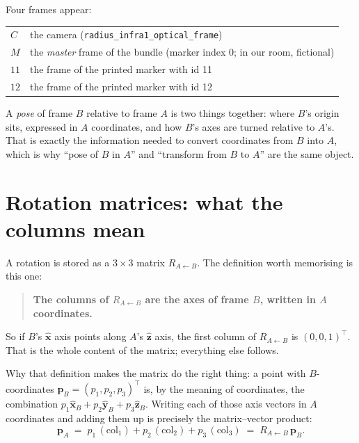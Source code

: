 \documentclass[11pt,a4paper]{article}
\newcommand{\R}[2]{R_{#1 \leftarrow #2}}
\newcommand{\vt}[1]{\mathbf{#1}}
\newcommand{\xh}{\hat{\vt{x}}}
\newcommand{\yh}{\hat{\vt{y}}}
\newcommand{\zh}{\hat{\vt{z}}}
\begin{document}
Four frames appear:

\begin{center}
\begin{tabular}{ll}
\toprule
$C$ & the camera (\texttt{radius\_infra1\_optical\_frame}) \\
$M$ & the \emph{master} frame of the bundle (marker index 0; in our room, fictional) \\
$11$ & the frame of the printed marker with id 11 \\
$12$ & the frame of the printed marker with id 12 \\
\bottomrule
\end{tabular}
\end{center}

A \emph{pose} of frame $B$ relative to frame $A$ is two things together: where $B$'s
origin sits, expressed in $A$ coordinates, and how $B$'s axes are turned relative to
$A$'s. That is exactly the information needed to convert coordinates from $B$ into $A$,
which is why ``pose of $B$ in $A$'' and ``transform from $B$ to $A$'' are the same object.

\section{Rotation matrices: what the columns mean}

A rotation is stored as a $3\times3$ matrix $\R{A}{B}$. The definition worth memorising
is this one:

\begin{quote}
\textbf{The columns of $\R{A}{B}$ are the axes of frame $B$, written in $A$ coordinates.}
\end{quote}

So if $B$'s $\xh$ axis points along $A$'s $\zh$ axis, the first column of $\R{A}{B}$ is
$(0,0,1)^{\!\top}$. That is the whole content of the matrix; everything else follows.

Why that definition makes the matrix do the right thing: a point with $B$-coordinates
$\vt{p}_B = (p_1,p_2,p_3)^{\!\top}$ is, by the meaning of coordinates, the combination
$p_1 \xh_B + p_2 \yh_B + p_3 \zh_B$. Writing each of those axis vectors in $A$
coordinates and adding them up is precisely the matrix--vector product:
\begin{equation}
  \vt{p}_A \;=\; p_1\,(\text{col}_1) + p_2\,(\text{col}_2) + p_3\,(\text{col}_3)
           \;=\; \R{A}{B}\, \vt{p}_B .
\end{equation}
\end{document}
